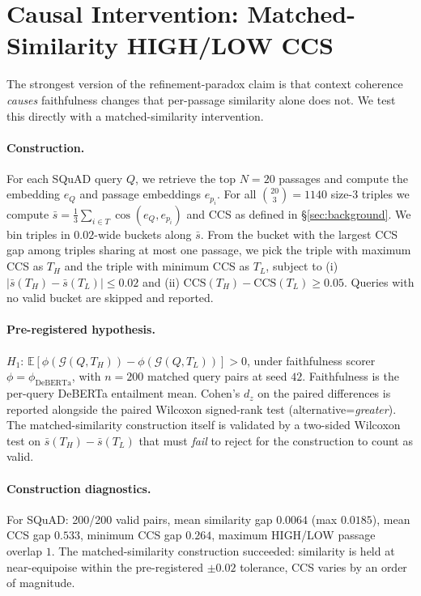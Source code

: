 \section{Causal Intervention: Matched-Similarity HIGH/LOW CCS}
\label{sec:causal_intervention}

The strongest version of the refinement-paradox claim is that
context coherence \emph{causes} faithfulness changes that
per-passage similarity alone does not. We test this directly with a
matched-similarity intervention.

\paragraph{Construction.}
For each SQuAD query $Q$, we retrieve the top $N{=}20$ passages
and compute the embedding $e_Q$ and passage embeddings $e_{p_i}$.
For all $\binom{20}{3}{=}1140$ size-3 triples we compute
\(\bar s = \tfrac{1}{3}\sum_{i \in T} \cos(e_Q, e_{p_i})\)
and CCS as defined in \S\ref{sec:background}. We bin triples in
$0.02$-wide buckets along $\bar s$. From the bucket with the
largest CCS gap among triples sharing at most one passage, we pick
the triple with maximum CCS as $T_H$ and the triple with minimum
CCS as $T_L$, subject to (i) $|\bar s(T_H) - \bar s(T_L)|\le 0.02$
and (ii) $\mathrm{CCS}(T_H) - \mathrm{CCS}(T_L) \ge 0.05$.
Queries with no valid bucket are skipped and reported.

\paragraph{Pre-registered hypothesis.}
\(H_1\): \(\mathbb{E}[\phi(\mathcal{G}(Q, T_H)) - \phi(\mathcal{G}(Q, T_L))] > 0\),
under faithfulness scorer $\phi=\phi_{\mathrm{DeBERTa}}$, with
$n{=}200$ matched query pairs at seed $42$. Faithfulness is the
per-query DeBERTa entailment mean. Cohen's $d_z$ on the paired
differences is reported alongside the paired Wilcoxon signed-rank
test (alternative=\textit{greater}). The matched-similarity
construction itself is validated by a two-sided Wilcoxon test on
$\bar s(T_H) - \bar s(T_L)$ that must \emph{fail} to reject for the
construction to count as valid.

\paragraph{Construction diagnostics.}
For SQuAD: 200/200 valid pairs, mean similarity gap
$0.0064$ (max $0.0185$), mean CCS gap $0.533$, minimum CCS gap
$0.264$, maximum HIGH/LOW passage overlap $1$. The matched-similarity
construction succeeded: similarity is held at near-equipoise within
the pre-registered $\pm 0.02$ tolerance, CCS varies by an order of
magnitude.


